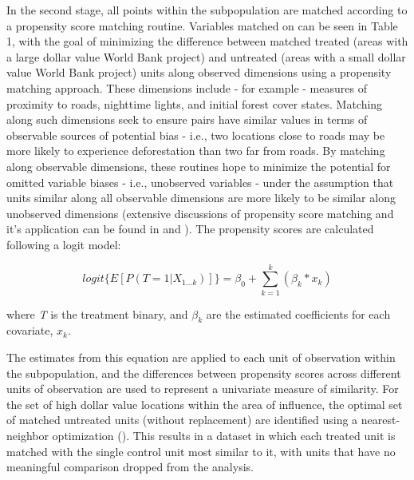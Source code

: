 \documentclass[sustainability,article,submit,moreauthors,pdftex,10pt,a4paper]{mdpi}
\begin{document}
In the second stage, all points within the subpopulation are matched according to a propensity score matching routine.  Variables matched on can be seen in Table 1, with the goal of minimizing the difference between matched treated (areas with a large dollar value World Bank project) and untreated (areas with a small dollar value World Bank project) units along observed dimensions using a propensity matching approach. These dimensions include - for example - measures of proximity to roads, nighttime lights, and initial forest cover states. Matching along such dimensions seek to ensure pairs have similar values in terms of observable sources of potential bias - i.e., two locations close to roads may be more likely to experience deforestation than two far from roads. By matching along observable dimensions, these routines hope to minimize the potential for omitted variable biases - i.e., unobserved variables - under the assumption that units similar along all observable dimensions are more likely to be similar along unobserved dimensions (extensive discussions of propensity score matching and it's application can be found in \cite{rubin_estimating_1997} and \cite{abbay_does_2015}). The propensity scores are calculated following a logit model:

\begin{equation}
logit \Bigg \{ {E} [P(T=1 | X_{1...k})] \Bigg \}= \beta_{0} + \sum_{k=1}^{k}(\beta_{k}*x_{k})
\label{EQpropensity}
\end{equation}

where \textit{T} is the treatment binary, and \begin{math}\beta_{k}\end{math} are the estimated coefficients for each covariate, \begin{math}x_{k}\end{math}.  
\par
The estimates from this equation are applied to each unit of observation within the subpopulation, and the differences between propensity scores across different units of observation are used to represent a univariate measure of similarity. For the set of high dollar value locations within the area of influence, the optimal set of matched untreated units (without replacement) are identified using a nearest-neighbor optimization (\cite{ho_matchit:_2011}). This results in a dataset in which each treated unit is matched with the single control unit most similar to it, with units that have no meaningful comparison dropped from the analysis.
\par
\end{document}
